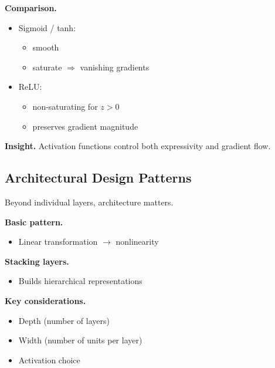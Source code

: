 \medskip

\noindent
\textbf{Comparison.}

\begin{itemize}
    \item Sigmoid / tanh:
    \begin{itemize}
        \item smooth
        \item saturate $\Rightarrow$ vanishing gradients
    \end{itemize}

    \item ReLU:
    \begin{itemize}
        \item non-saturating for $z > 0$
        \item preserves gradient magnitude
    \end{itemize}
\end{itemize}

\medskip

\noindent
\textbf{Insight.}  
Activation functions control both expressivity and gradient flow.

\subsection{Architectural Design Patterns}

Beyond individual layers, architecture matters.

\medskip

\noindent
\textbf{Basic pattern.}
\begin{itemize}
    \item Linear transformation $\rightarrow$ nonlinearity
\end{itemize}

\medskip

\noindent
\textbf{Stacking layers.}
\begin{itemize}
    \item Builds hierarchical representations
\end{itemize}

\medskip

\noindent
\textbf{Key considerations.}

\begin{itemize}
    \item Depth (number of layers)
    \item Width (number of units per layer)
    \item Activation choice
\end{itemize}

